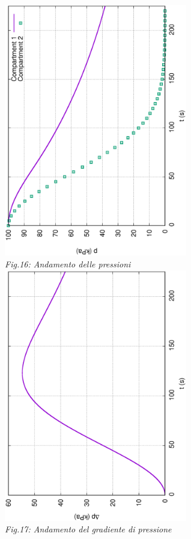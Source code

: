 \documentclass{article}
\begin{document}
        \begin{center}
            \includegraphics[width=0.6\textwidth, angle=-90]{MUL2/p_ES2_7.eps}\\ 
            \textit{Fig.16: Andamento delle pressioni} \\ 
            \includegraphics[width=0.6\textwidth, angle=-90]{MUL2/Dp_ES2_7.eps}\\
            \textit{Fig.17: Andamento del gradiente di pressione}\\
        \end{center}

        \pagebreak
        \printbibliography
\end{document}
